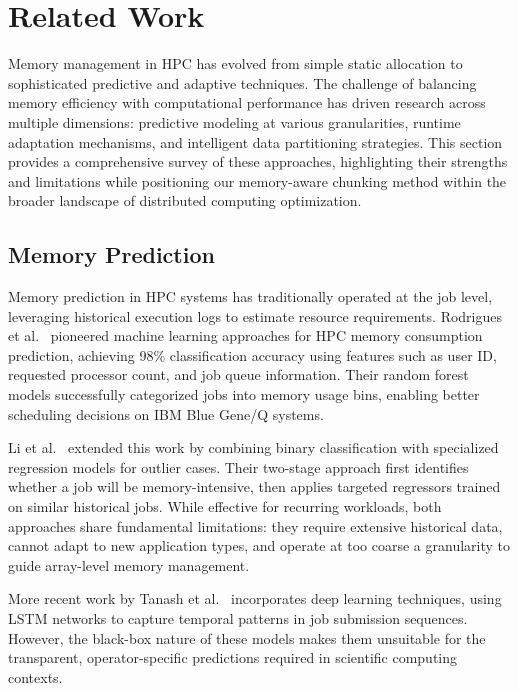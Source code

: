 \section{Related Work}
\label{sec:related-work}

Memory management in \ac{HPC} has evolved from simple static allocation to sophisticated predictive and adaptive techniques.
The challenge of balancing memory efficiency with computational performance has driven research across multiple dimensions: predictive modeling at various granularities, runtime adaptation mechanisms, and intelligent data partitioning strategies.
This section provides a comprehensive survey of these approaches, highlighting their strengths and limitations while positioning our memory-aware chunking method within the broader landscape of distributed computing optimization.

\subsection{Memory  Prediction}

Memory  prediction in \ac{HPC} systems has traditionally operated at the job level, leveraging historical execution logs to estimate resource requirements.
Rodrigues et al.~\cite{rodrigues2016} pioneered machine learning approaches for HPC memory consumption prediction, achieving 98\% classification accuracy using features such as user ID, requested processor count, and job queue information.
Their random forest models successfully categorized jobs into memory usage bins, enabling better scheduling decisions on IBM Blue Gene/Q systems.

Li et al.~\cite{li2019} extended this work by combining binary classification with specialized regression models for outlier cases.
Their two-stage approach first identifies whether a job will be memory-intensive, then applies targeted regressors trained on similar historical jobs.
While effective for recurring workloads, both approaches share fundamental limitations: they require extensive historical data, cannot adapt to new application types, and operate at too coarse a granularity to guide array-level memory management.

More recent work by Tanash et al.~\cite{tanash2021ampro} incorporates deep learning techniques, using LSTM networks to capture temporal patterns in job submission sequences.
However, the black-box nature of these models makes them unsuitable for the transparent, operator-specific predictions required in scientific computing contexts.

